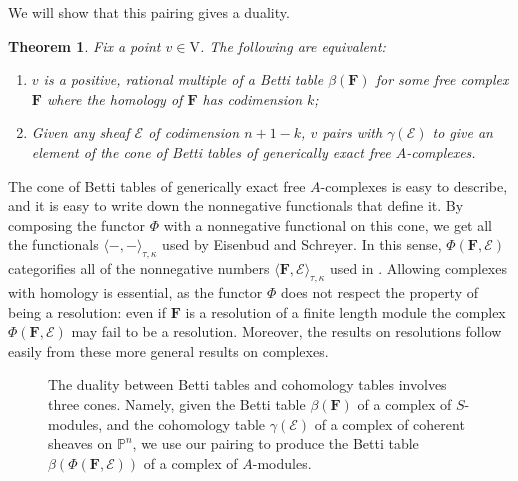 \documentclass[12pt]{amsart}
\newtheorem{thm}[lemma]{Theorem}
\theoremstyle{definition}
\theoremstyle{remark}
\newcommand{\PP}{\mathbb{P}}
\newcommand{\VV}{\mathrm{V}}
\newcommand{\cE}{\mathcal{E}}
\newcommand{\FF}{\mathbf{F}}
\begin{document}
We will show that this pairing gives a duality.
\begin{thm}\label{thm:duality}
Fix a point $v\in \VV$.   The following are equivalent:
\begin{enumerate}
	\item   $v$ is a positive, rational multiple of a Betti table $\beta(\FF)$ for some free complex $\FF$ where the homology of $\FF$ has codimension $k$;
	\item  Given any sheaf $\cE$ of codimension $n+1-k$, $v$ pairs with $\gamma(\cE)$ to give an element of the cone of Betti tables of generically exact free $A$-complexes.
\end{enumerate}
\end{thm}

The cone of Betti tables of generically exact free $A$-complexes is easy to describe, and it is easy to write down the nonnegative functionals that define it.
By composing the functor $\Phi$ with a nonnegative functional on this cone, we get all the functionals $\langle -,-\rangle_{\tau,\kappa}$ used by Eisenbud and Schreyer. In this sense, $\Phi(\FF,\cE)$ categorifies all of the nonnegative numbers $\langle \FF, \cE\rangle_{\tau,\kappa}$ used in \cite{eis-schrey1}. Allowing complexes with homology is essential, as the functor $\Phi$ does not respect the property of being a resolution: even if $\FF$ is a resolution of a finite length module the complex $\Phi(\FF,\cE)$ may fail to be a resolution. Moreover, the results on resolutions follow easily from these more general results on complexes.


\begin{figure}
\caption{The duality between Betti tables and cohomology tables involves three cones.  Namely, given the Betti table $\beta(\FF)$ of a complex of $S$-modules, and the cohomology table $\gamma(\cE)$ of a complex of coherent sheaves on $\PP^n$, we use our pairing to produce the Betti table $\beta(\Phi(\FF,\cE))$ of a complex of $A$-modules. 
}
\label{fig:bracket}
\end{figure}
\end{document}
